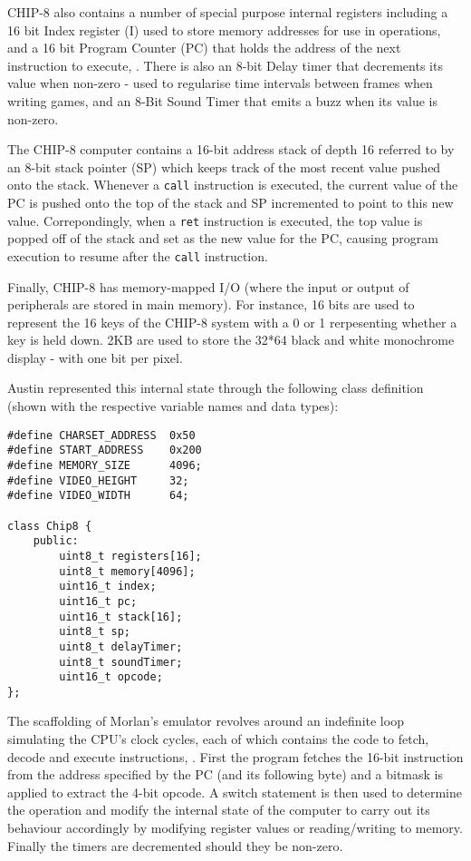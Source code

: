 CHIP-8 also contains a number of special purpose internal registers including a 16 bit Index register (I) used to store memory addresses for use in operations, and a 16 bit Program Counter (PC) that holds the address of the next instruction to execute, \textcite{CHIP-8-blog}. There is also an 8-bit Delay timer that decrements its value when non-zero - used to regularise time intervals between frames when writing games, and an 8-Bit Sound Timer that emits a buzz when its value is non-zero.

The CHIP-8 computer contains a 16-bit address stack of depth 16 referred to by an 8-bit stack pointer (SP) which keeps track of the most recent value pushed onto the stack. Whenever a \texttt{call} instruction is executed, the current value of the PC is pushed onto the top of the stack and SP incremented to point to this new value. Correpondingly, when a \texttt{ret} instruction is executed, the top value is popped off of the stack and set as the new value for the PC, causing program execution to resume after the \texttt{call} instruction.

Finally, CHIP-8 has memory-mapped I/O (where the input or output of peripherals are stored in main memory). For instance, 16 bits are used to represent the 16 keys of the CHIP-8 system with a 0 or 1 rerpesenting whether a key is held down. 2KB are used to store the 32*64 black and white monochrome display - with one bit per pixel.

Austin represented this internal state through the following class definition (shown with the respective variable names and data types):
\begin{lstlisting}
#define CHARSET_ADDRESS  0x50
#define START_ADDRESS    0x200
#define MEMORY_SIZE      4096;
#define VIDEO_HEIGHT     32;
#define VIDEO_WIDTH      64;

class Chip8 {
    public:
        uint8_t registers[16];
        uint8_t memory[4096];
        uint16_t index;
        uint16_t pc;
        uint16_t stack[16];
        uint8_t sp;
        uint8_t delayTimer;
        uint8_t soundTimer;
        uint16_t opcode;
};
\end{lstlisting}

The scaffolding of Morlan's emulator revolves around an indefinite loop simulating the CPU's clock cycles, each of which contains the code to fetch, decode and execute instructions, \textcite{Muller-CHIP-8}. First the program fetches the 16-bit instruction from the address specified by the PC (and its following byte) and a bitmask is applied to extract the 4-bit opcode. A switch statement is then used to determine the operation and modify the internal state of the computer to carry out its behaviour accordingly by modifying register values or reading/writing to memory. Finally the timers are decremented should they be non-zero. 

